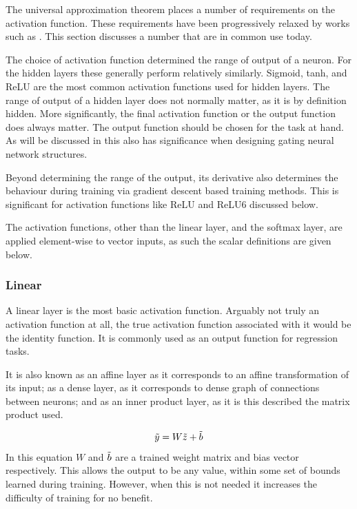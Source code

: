 \documentclass[12pt,parskip]{komatufte}
\begin{document}
The universal approximation theorem places a number of requirements on the activation function.
These requirements have been progressively relaxed by works such as \textcite{leshno1993uat, SONODA2017uat}.
This section discusses a number that are in common use today.

The choice of activation function determined the range of output of a neuron.
For the hidden layers these generally perform relatively similarly.
Sigmoid, tanh, and ReLU are the most common activation functions used for hidden layers.
The range of output of a hidden layer does not normally matter, as it is by definition hidden.
More significantly, the final activation function or the output function does always matter.
The output function should be chosen for the task at hand.
As will be discussed in  this also has significance when designing gating neural network structures.

Beyond determining the range of the output, its derivative also determines the behaviour during training via gradient descent based training methods.
This is significant for activation functions like ReLU and ReLU6 discussed below.

The activation functions, other than the linear layer, and the softmax layer, are applied element-wise to vector inputs,
as such the scalar definitions are given below.

\subsubsection{Linear}
A linear layer is the most basic activation function.
Arguably not truly an activation function at all, the true activation function associated with it would be the identity function.
It is commonly used as an output function for regression tasks.

It is also known as an affine layer as it corresponds to an affine transformation of its input; as a dense layer, as it corresponds to dense graph of connections between neurons; and as an inner product layer, as it is this described the matrix product used.

\begin{equation}
\tilde{y}=W \tilde{z} + \tilde{b}
\end{equation}
In this equation $W$ and $\tilde{b}$ are a trained weight matrix and bias vector respectively.
This allows the output to be any value, within some set of bounds learned during training.
However, when this is not needed it increases the difficulty of training for no benefit.
\end{document}
